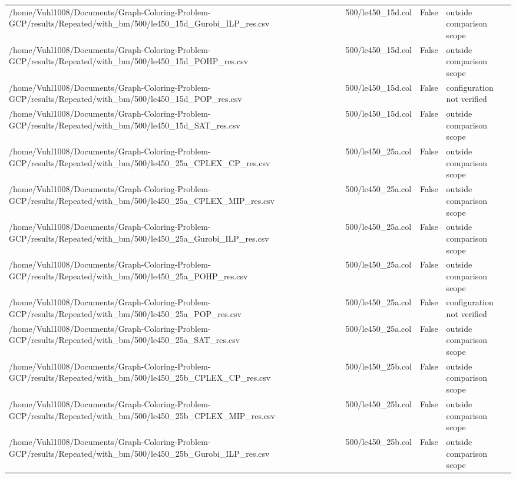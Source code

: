 \begin{table}[htbp]
\begin{tabular}{llll}
/home/Vuhl1008/Documents/Graph-Coloring-Problem-GCP/results/Repeated/with\_bm/500/le450\_15d\_Gurobi\_ILP\_res.csv & 500/le450\_15d.col & False & outside comparison scope \\
/home/Vuhl1008/Documents/Graph-Coloring-Problem-GCP/results/Repeated/with\_bm/500/le450\_15d\_POHP\_res.csv & 500/le450\_15d.col & False & outside comparison scope \\
/home/Vuhl1008/Documents/Graph-Coloring-Problem-GCP/results/Repeated/with\_bm/500/le450\_15d\_POP\_res.csv & 500/le450\_15d.col & False & configuration not verified \\
/home/Vuhl1008/Documents/Graph-Coloring-Problem-GCP/results/Repeated/with\_bm/500/le450\_15d\_SAT\_res.csv & 500/le450\_15d.col & False & outside comparison scope \\
/home/Vuhl1008/Documents/Graph-Coloring-Problem-GCP/results/Repeated/with\_bm/500/le450\_25a\_CPLEX\_CP\_res.csv & 500/le450\_25a.col & False & outside comparison scope \\
/home/Vuhl1008/Documents/Graph-Coloring-Problem-GCP/results/Repeated/with\_bm/500/le450\_25a\_CPLEX\_MIP\_res.csv & 500/le450\_25a.col & False & outside comparison scope \\
/home/Vuhl1008/Documents/Graph-Coloring-Problem-GCP/results/Repeated/with\_bm/500/le450\_25a\_Gurobi\_ILP\_res.csv & 500/le450\_25a.col & False & outside comparison scope \\
/home/Vuhl1008/Documents/Graph-Coloring-Problem-GCP/results/Repeated/with\_bm/500/le450\_25a\_POHP\_res.csv & 500/le450\_25a.col & False & outside comparison scope \\
/home/Vuhl1008/Documents/Graph-Coloring-Problem-GCP/results/Repeated/with\_bm/500/le450\_25a\_POP\_res.csv & 500/le450\_25a.col & False & configuration not verified \\
/home/Vuhl1008/Documents/Graph-Coloring-Problem-GCP/results/Repeated/with\_bm/500/le450\_25a\_SAT\_res.csv & 500/le450\_25a.col & False & outside comparison scope \\
/home/Vuhl1008/Documents/Graph-Coloring-Problem-GCP/results/Repeated/with\_bm/500/le450\_25b\_CPLEX\_CP\_res.csv & 500/le450\_25b.col & False & outside comparison scope \\
/home/Vuhl1008/Documents/Graph-Coloring-Problem-GCP/results/Repeated/with\_bm/500/le450\_25b\_CPLEX\_MIP\_res.csv & 500/le450\_25b.col & False & outside comparison scope \\
/home/Vuhl1008/Documents/Graph-Coloring-Problem-GCP/results/Repeated/with\_bm/500/le450\_25b\_Gurobi\_ILP\_res.csv & 500/le450\_25b.col & False & outside comparison scope \\

\end{tabular}
\end{table}

